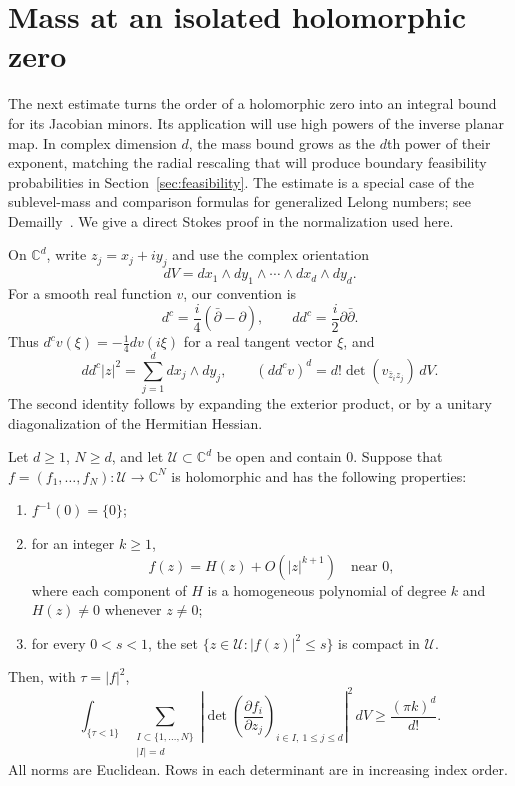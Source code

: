 \section{Mass at an isolated holomorphic zero}
\label{sec:holomorphic-mass}

The next estimate turns the order of a holomorphic zero into an integral
bound for its Jacobian minors. Its application will use high powers of the
inverse planar map. In complex dimension $d$, the mass bound grows as the
$d$th power of their exponent, matching the radial rescaling that will produce boundary
feasibility probabilities in Section~\ref{sec:feasibility}.
The estimate is a special case of the sublevel-mass and comparison
formulas for generalized Lelong numbers; see
Demailly~\cite[Sections~3 and~5]{Demailly}. We give a direct Stokes
proof in the normalization used here.

On $\mathbb C^d$, write $z_j=x_j+iy_j$ and use the complex orientation
\[
dV=dx_1\wedge dy_1\wedge\cdots\wedge dx_d\wedge dy_d.
\]
For a smooth real function $v$, our convention is
\begin{equation}\label{eq:mass-dc-convention}
d^c=\frac{i}{4}(\bar\partial-\partial),
\qquad dd^c=\frac{i}{2}\partial\bar\partial.
\end{equation}
Thus $d^cv(\xi)=-\tfrac14dv(i\xi)$ for a real tangent vector $\xi$, and
\begin{equation}\label{eq:mass-volume-normalization}
dd^c|z|^2=\sum_{j=1}^d dx_j\wedge dy_j,
\qquad
(dd^cv)^d=d!\det(v_{\bar z_i z_j})\,dV.
\end{equation}
The second identity follows by expanding the exterior product, or by a
unitary diagonalization of the Hermitian Hessian.

\begin{lemma}\label{lem:holomorphic-mass}
Let $d\geq1$, $N\geq d$, and let $\mathcal U\subset\mathbb C^d$ be open
and contain $0$. Suppose that $f=(f_1,\ldots,f_N):\mathcal U\to\mathbb C^N$
is holomorphic and has the following properties:
\begin{enumerate}
\item $f^{-1}(0)=\{0\}$;
\item for an integer $k\geq1$,
\[
f(z)=H(z)+O(|z|^{k+1})\quad\text{near }0,
\]
where each component of $H$ is a homogeneous polynomial of degree $k$
and $H(z)\ne0$ whenever $z\ne0$;
\item for every $0<s<1$, the set
$\{z\in\mathcal U:|f(z)|^2\leq s\}$ is compact in $\mathcal U$.
\end{enumerate}
Then, with $\tau=|f|^2$,
\begin{equation}\label{eq:holomorphic-minor-mass}
\int_{\{\tau<1\}}
 \sum_{\substack{I\subset\{1,\ldots,N\}\\|I|=d}}
 \left|\det\left(\frac{\partial f_i}{\partial z_j}\right)_{
                       i\in I,\ 1\leq j\leq d}\right|^2\,dV
\geq \frac{(\pi k)^d}{d!}.
\end{equation}
All norms are Euclidean. Rows in each determinant are in increasing index
order.
\end{lemma}

